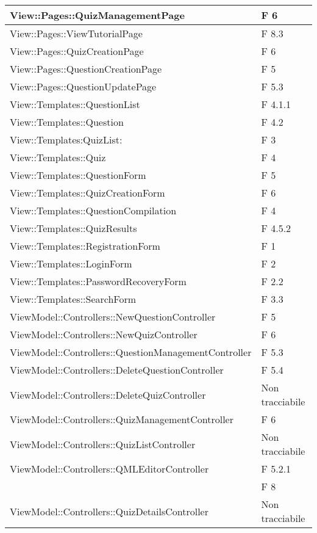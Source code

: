 \begin{longtable}{p{}p{}}
\midrule
View::Pages::QuizManagementPage	& F 6\\

\midrule
View::Pages::ViewTutorialPage	& F 8.3\\

\midrule
View::Pages::QuizCreationPage	& F 6\\

\midrule
View::Pages::QuestionCreationPage	& F 5\\

\midrule
View::Pages::QuestionUpdatePage	& F 5.3\\


\midrule
View::Templates::QuestionList	& F 4.1.1\\
\midrule
View::Templates::Question	& F 4.2\\
\midrule
View::Templates:QuizList:	& F 3\\
\midrule
View::Templates::Quiz	& F 4\\
\midrule
View::Templates::QuestionForm	& F 5\\
\midrule
View::Templates::QuizCreationForm	& F 6\\
\midrule
View::Templates::QuestionCompilation	& F 4\\
\midrule
View::Templates::QuizResults	& F 4.5.2\\
\midrule
View::Templates::RegistrationForm	& F 1\\
\midrule
View::Templates::LoginForm	& F 2\\
\midrule
View::Templates::PasswordRecoveryForm	& F 2.2\\
\midrule
View::Templates::SearchForm	& F 3.3\\




\midrule
ViewModel::Controllers::NewQuestionController	& F 5\\
\midrule
ViewModel::Controllers::NewQuizController	& F 6\\
\midrule
ViewModel::Controllers::QuestionManagementController	& F 5.3\\
\midrule
ViewModel::Controllers::DeleteQuestionController	& F 5.4\\
\midrule
ViewModel::Controllers::DeleteQuizController	& Non tracciabile\\
\midrule
ViewModel::Controllers::QuizManagementController	& F 6\\
\midrule
ViewModel::Controllers::QuizListController	& Non tracciabile\\
\midrule
ViewModel::Controllers::QMLEditorController	& F 5.2.1\\
							& F 8\\
\midrule
ViewModel::Controllers::QuizDetailsController	& Non tracciabile\\


\end{longtable}
